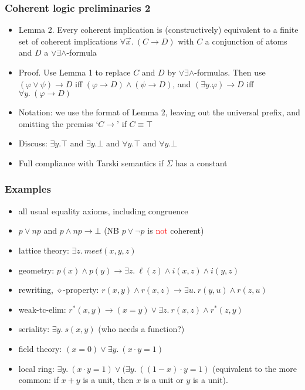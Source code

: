\documentclass[handout,11pt]{beamer}
\newcommand{\red}[1]{\textcolor{red}{#1}}
\newcommand{\deca}{${\lor}{\exists}{\land}$}
\begin{document}
\begin{frame}
\frametitle{Coherent logic preliminaries 2}
 \begin{itemize}[<+->]   %
    \item Lemma 2. Every coherent implication is (constructively) 
    equivalent to a finite set of coherent implications
    $\forall\vec{x}.~(C \to D)$ 
    with $C$ a conjunction of atoms and $D$ a \deca-formula
    \item Proof. Use Lemma 1 to replace $C$ and $D$ by \deca-formulas.
    Then use $(\varphi\lor\psi)\to D$ iff $(\varphi\to D)\land(\psi\to D)$,
    and $(\exists y.\varphi)\to D$ iff $\forall y.~(\varphi\to D)$
    \item Notation: we use the format of Lemma 2, 
    leaving out the universal prefix, and omitting the premiss `$C\to{}$' 
    if $C\equiv\top$
    \item Discuss: $\exists y.\top$ and $\exists y.\bot$ and
    $\forall y.\top$ and $\forall y.\bot$
    \item Full compliance with Tarski semantics if $\Sigma$ has a constant
 \end{itemize}
\end{frame}

\begin{frame}
\frametitle{Examples}
 \begin{itemize}[<+->]   %
    \item all usual equality axioms, including congruence
    \item $p\lor np$ and $p\land np\to\bot$ 
    (NB $p\lor\neg p$ is \red{not} coherent)
    \item lattice theory: $%
    \exists z.~\mathit{meet}(x,y,z)$
    \item geometry: $%
    p(x)\land p(y) \to \exists z.~\ell(z) \land i(x,z) \land i(y,z)$
    \item rewriting, $\diamond$-property: $%
    r(x,y)\land r(x,z) \to \exists u.~r(y,u)\land r(z,u)$
    \item weak-tc-elim: $%
    r^*(x,y)\to (x=y)\lor\exists z.~r(x,z)\land r^*(z,y)$     
    \item seriality: $%
    \exists y.~s(x,y)$ (who needs a function?)
    \item field theory: $%
    (x=0) \lor \exists y.~(x\cdot y=1)$
    \item local ring: 
    $\exists y.~(x\cdot y = 1) \lor (\exists y.~((1-x)\cdot y = 1)$
    (equivalent to the more common: if $x+y$ is a unit, then $x$ is a
    unit or $y$ is a unit).
 \end{itemize}
\end{frame}
\end{document}
